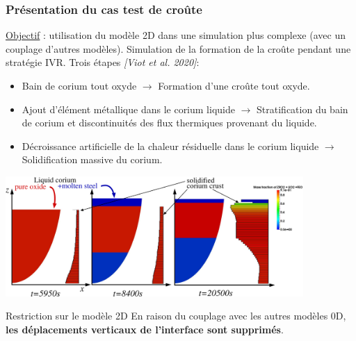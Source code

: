 \documentclass{beamer}
\newcommand{\bib}[1]{{\color{cea_texte!80}\tiny\textit{[#1]}}}
\begin{document}
\begin{frame}
    \frametitle{Présentation du cas test de croûte}
 \scriptsize
    \underline{Objectif} : utilisation du modèle 2D dans une simulation plus complexe (avec un couplage d'autres modèles). Simulation de la formation de la croûte pendant une stratégie IVR. Trois étapes \bib{Viot et al. 2020}:
    \begin{itemize}
        \item Bain de corium tout oxyde $\rightarrow$ Formation d'une croûte tout oxyde.
        \item Ajout d'élément métallique dans le corium liquide $\rightarrow$ Stratification du bain de corium et discontinuités des flux thermiques provenant du liquide.
        \item Décroissance artificielle de la chaleur résiduelle dans le corium liquide  $\rightarrow$ Solidification massive du corium.
    \end{itemize}
    \begin{center}
    \includegraphics[width=0.85\textwidth]{Figures/industrial_test_sketch.pdf}
    \end{center}
    
        	\begin{ceaalertblock}{Restriction sur le modèle 2D}
        	\tiny
        	En raison du couplage avec les autres modèles 0D, \textbf{les déplacements verticaux de l'interface sont supprimés}.
    	\end{ceaalertblock}
    
\end{frame}
\end{document}
